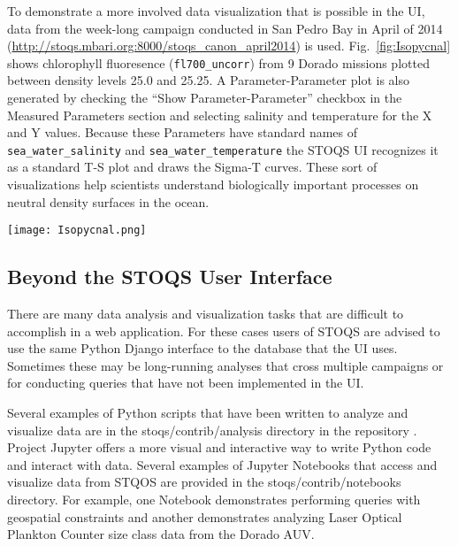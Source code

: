\documentclass[conference]{IEEEtran}
\begin{document}
To demonstrate a more involved data visualization that is possible in the UI, data from the week-long
campaign conducted in San Pedro Bay in April of 2014 
(\url{http://stoqs.mbari.org:8000/stoqs_canon_april2014}) is used.
Fig.~\ref{fig:Isopycnal} shows chlorophyll fluoresence (\texttt{fl700\_uncorr}) from 9 Dorado missions 
plotted between density levels 25.0 and 25.25. A Parameter-Parameter plot is also generated
by checking the ``Show Parameter-Parameter'' checkbox in the Measured Parameters section
and selecting salinity and temperature for the X and Y values. Because these Parameters
have standard names of \texttt{sea\_water\_salinity} and \texttt{sea\_water\_temperature} the STOQS
UI recognizes it as a standard T-S plot and draws the Sigma-T curves.
These sort of visualizations help scientists understand biologically important processes
on neutral density surfaces in the ocean.

\begin{figure*}[htbp]
\centering
\texttt{[image: Isopycnal.png]}
\caption{Chlorophyll fluoresence measurement from a week-long set of missions by AUV Dorado 
selected for plotting between isopycnal values of 25.0 and 25.25. Higher values are seen
on the shelf supporting the hypothesis that the shallower water acts as an incubator for
phytoplankton.}
\label{fig:Isopycnal}
\end{figure*}




\subsection{Beyond the STOQS User Interface}

There are many data analysis and visualization tasks that are difficult to
accomplish in a web application. For these cases users of STOQS are advised to 
use the same Python Django interface to the database that the UI
uses. Sometimes these may be long-running analyses that cross
multiple campaigns or for conducting queries that have not been implemented
in the UI.

Several examples of Python scripts that have been written to analyze and
visualize data are in the stoqs/contrib/analysis directory 
in the repository \cite{stoqs_github}. Project Jupyter 
offers a more visual and interactive way to write Python code and interact
with data. Several examples of Jupyter Notebooks that access and visualize
data from STQOS are provided in the stoqs/contrib/notebooks directory.
For example, one Notebook demonstrates performing queries with geospatial
constraints and another demonstrates analyzing Laser Optical
Plankton Counter size class data from the Dorado AUV.
\end{document}
